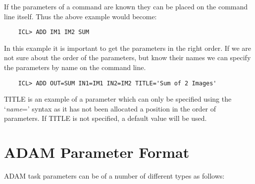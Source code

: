 If the parameters of a command are known they can be placed on the command
line itself. Thus the above example would become:

\begin{verbatim}
    ICL> ADD IM1 IM2 SUM
\end{verbatim}

In this example it is important to get the parameters in the right order.
If we are not sure about the order of the parameters, but know their names
we can specify the parameters by name on the command line.

\begin{verbatim}
    ICL> ADD OUT=SUM IN1=IM1 IN2=IM2 TITLE='Sum of 2 Images'
\end{verbatim}

TITLE is an example of a parameter which can only be specified using the 
`{\em name}\/=' syntax as it has not been allocated a position in the order of
parameters.
If TITLE is not specified, a default value will be used.

\section{ADAM Parameter Format}
                 
ADAM task parameters can be of a number of different types as follows:

